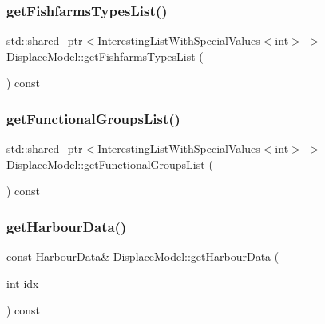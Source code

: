 \subsubsection{\texorpdfstring{getFishfarmsTypesList()}{getFishfarmsTypesList()}}
{\footnotesize\ttfamily std\+::shared\+\_\+ptr$<$\mbox{\hyperlink{class_interesting_list_with_special_values}{Interesting\+List\+With\+Special\+Values}}$<$int$>$ $>$ Displace\+Model\+::get\+Fishfarms\+Types\+List (\begin{DoxyParamCaption}{ }\end{DoxyParamCaption}) const\hspace{0.3cm}{\ttfamily [inline]}}

\mbox{\label{class_displace_model_a79d7922027537fa190c72c22cc297f6a}} 
\subsubsection{\texorpdfstring{getFunctionalGroupsList()}{getFunctionalGroupsList()}}
{\footnotesize\ttfamily std\+::shared\+\_\+ptr$<$\mbox{\hyperlink{class_interesting_list_with_special_values}{Interesting\+List\+With\+Special\+Values}}$<$int$>$ $>$ Displace\+Model\+::get\+Functional\+Groups\+List (\begin{DoxyParamCaption}{ }\end{DoxyParamCaption}) const\hspace{0.3cm}{\ttfamily [inline]}}

\mbox{\label{class_displace_model_a0bdadd4654aea55d6e0481f43bc035fb}} 
\subsubsection{\texorpdfstring{getHarbourData()}{getHarbourData()}}
{\footnotesize\ttfamily const \mbox{\hyperlink{class_harbour_data}{Harbour\+Data}}\& Displace\+Model\+::get\+Harbour\+Data (\begin{DoxyParamCaption}\item[{int}]{idx }\end{DoxyParamCaption}) const\hspace{0.3cm}{\ttfamily [inline]}}

